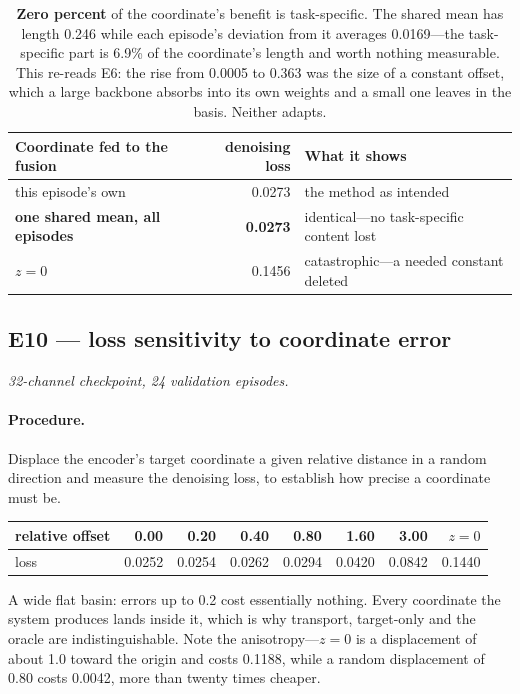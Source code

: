 \documentclass[11pt]{article}
\begin{document}
\begin{table}[htbp]
\centering\small
\begin{tabular}{@{}lrl@{}}
\toprule
\textbf{Coordinate fed to the fusion} & \textbf{denoising loss} & \textbf{What it shows} \\
\midrule
this episode's own            & 0.0273 & the method as intended \\
\textbf{one shared mean, all episodes} & \textbf{0.0273} & identical---no task-specific content lost \\
$z=0$                         & 0.1456 & catastrophic---a needed constant deleted \\
\bottomrule
\end{tabular}
\caption{\textbf{Zero percent} of the coordinate's benefit is task-specific. The shared mean has
length 0.246 while each episode's deviation from it averages 0.0169---the task-specific part is
6.9\% of the coordinate's length and worth nothing measurable. This re-reads E6: the rise from
0.0005 to 0.363 was the size of a constant offset, which a large backbone absorbs into its own
weights and a small one leaves in the basis. Neither adapts.}
\end{table}

\subsection{E10 --- loss sensitivity to coordinate error}

\textit{32-channel checkpoint, 24 validation episodes.}

\paragraph{Procedure.} Displace the encoder's target coordinate a given relative distance in a
random direction and measure the denoising loss, to establish how precise a coordinate must be.

\begin{center}\small
\begin{tabular}{@{}lrrrrrrr@{}}
\toprule
relative offset & 0.00 & 0.20 & 0.40 & 0.80 & 1.60 & 3.00 & $z=0$ \\
\midrule
loss & 0.0252 & 0.0254 & 0.0262 & 0.0294 & 0.0420 & 0.0842 & 0.1440 \\
\bottomrule
\end{tabular}
\end{center}

A wide flat basin: errors up to 0.2 cost essentially nothing. Every coordinate the system produces
lands inside it, which is why transport, target-only and the oracle are indistinguishable. Note the
anisotropy---$z=0$ is a displacement of about 1.0 toward the origin and costs 0.1188, while a random
displacement of 0.80 costs 0.0042, more than twenty times cheaper.
\end{document}
